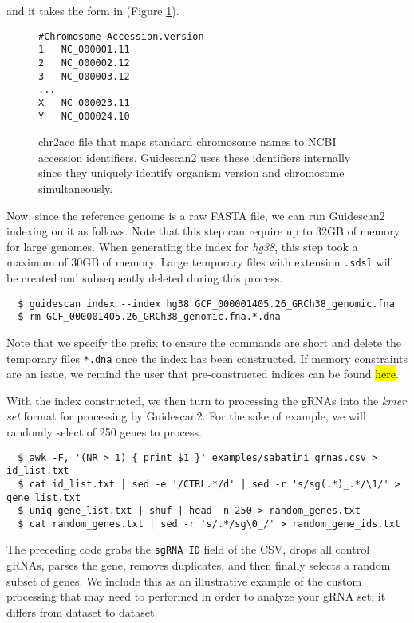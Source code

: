 \documentclass[11pt]{article}
\begin{document}
and it takes the form in (Figure \ref{fig:chr2acc}).

\begin{figure}[t]
  \centering
  \begin{verbatim}
#Chromosome	Accession.version
1	NC_000001.11
2	NC_000002.12
3	NC_000003.12
...
X	NC_000023.11
Y	NC_000024.10
    \end{verbatim}
    \caption{\label{fig:chr2acc} chr2acc file that maps standard
      chromosome names to NCBI accession identifiers. Guidescan2 uses
      these identifiers internally since they uniquely identify
      organism version and chromosome simultaneously. }
\end{figure}

Now, since the reference genome is a raw FASTA file, we can run
Guidescan2 indexing on it as follows. Note that this step can require
up to 32GB of memory for large genomes. When generating the index for
\textit{hg38}, this step took a maximum of 30GB of memory. Large
temporary files with extension \texttt{.sdsl} will be created and
subsequently deleted during this process.

\begin{verbatim}
  $ guidescan index --index hg38 GCF_000001405.26_GRCh38_genomic.fna
  $ rm GCF_000001405.26_GRCh38_genomic.fna.*.dna
\end{verbatim}

Note that we specify the prefix to ensure the commands are short and
delete the temporary files \texttt{*.dna} once the index has been
constructed. If memory constraints are an issue, we remind the user
that pre-constructed indices can be found \hl{here}.

With the index constructed, we then turn to processing the gRNAs into
the {\it kmer set} format for processing by Guidescan2. For the sake
of example, we will randomly select of 250 genes to process.

\begin{verbatim}
  $ awk -F, '(NR > 1) { print $1 }' examples/sabatini_grnas.csv > id_list.txt
  $ cat id_list.txt | sed -e '/CTRL.*/d' | sed -r 's/sg(.*)_.*/\1/' > gene_list.txt
  $ uniq gene_list.txt | shuf | head -n 250 > random_genes.txt
  $ cat random_genes.txt | sed -r 's/.*/sg\0_/' > random_gene_ids.txt
\end{verbatim}

The preceding code grabs the \texttt{sgRNA ID} field of the CSV, drops
all control gRNAs, parses the gene, removes duplicates, and then
finally selects a random subset of genes. We include this as an
illustrative example of the custom processing that may need to
performed in order to analyze your gRNA set; it differs from dataset
to dataset.
\end{document}
